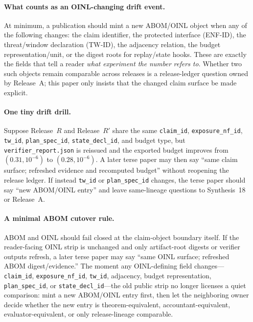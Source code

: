 \documentclass[11pt]{article}
\begin{document}
\paragraph{What counts as an OINL-changing drift event.}
At minimum, a publication should mint a new ABOM/OINL object when any of the following changes: the claim identifier, the protected interface (ENF-ID), the threat/window declaration (TW-ID), the adjacency relation, the budget representation/unit, or the digest roots for replay/state hooks.
These are exactly the fields that tell a reader \emph{what experiment the number refers to}.
Whether two such objects remain comparable across releases is a release-ledger question owned by Release~A; this paper only insists that the changed claim surface be made explicit.\cite{series:releaseproperty}

\paragraph{One tiny drift drill.} Suppose Release~\(R\) and Release~\(R'\) share the same \texttt{claim\_id}, \texttt{exposure\_nf\_id}, \texttt{tw\_id}, \texttt{plan\_spec\_id}, \texttt{state\_decl\_id}, and budget type, but \texttt{verifier\_report.json} is reissued and the exported budget improves from \((0.31,10^{-6})\) to \((0.28,10^{-6})\). A later terse paper may then say ``same claim surface; refreshed evidence and recomputed budget'' without reopening the release ledger. If instead \texttt{tw\_id} or \texttt{plan\_spec\_id} changes, the terse paper should say ``new ABOM/OINL entry'' and leave same-lineage questions to Synthesis~18 or Release~A.\cite{series:planstateequiv,series:releaseproperty}

\paragraph{A minimal ABOM cutover rule.}
ABOM and OINL should fail closed at the claim-object boundary itself. If the reader-facing OINL strip is unchanged and only artifact-root digests or verifier outputs refresh, a later terse paper may say ``same OINL surface; refreshed ABOM digest/evidence.'' The moment any OINL-defining field changes---\texttt{claim\_id}, \texttt{exposure\_nf\_id}, \texttt{tw\_id}, adjacency, budget representation, \texttt{plan\_spec\_id}, or \texttt{state\_decl\_id}---the old public strip no longer licenses a quiet comparison: mint a new ABOM/OINL entry first, then let the neighboring owner decide whether the new entry is theorem-equivalent, accountant-equivalent, evaluator-equivalent, or only release-lineage comparable.
\end{document}
